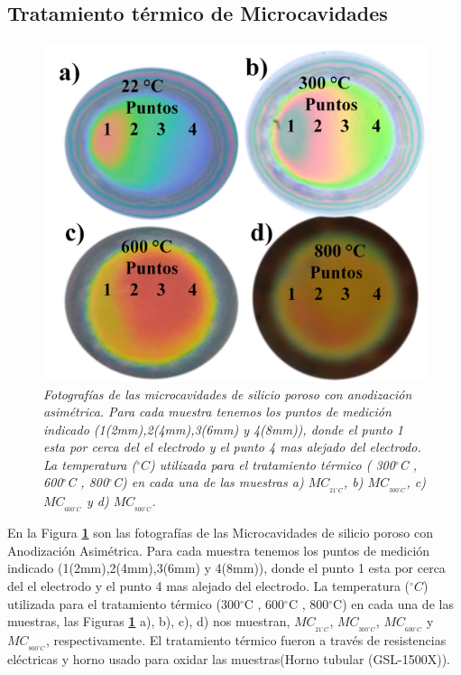 \documentclass[a4paper,11pt,]{book}
\newcommand{\grad}{$^{\circ}$}
\begin{document}
\subsection{Tratamiento térmico de Microcavidades}
\begin{figure}[H]
	\centering
	\includegraphics[scale=.15]{../Images/PsiTem}
	\caption{\emph{Fotografías de las  microcavidades de silicio poroso con anodización asimétrica. Para cada muestra tenemos los puntos de medición indicado (1(2mm),2(4mm),3(6mm) y 4(8mm)), donde el punto 1 esta por cerca del el electrodo y el punto 4 mas alejado del electrodo.  La temperatura ($^{\circ}C$) utilizada para el tratamiento térmico ( 300\grad C ,  600\grad C ,  800\grad C) en cada una de las  muestras a) $MC_{_{21^{\circ} C}}$, b) $MC_{_{300^{\circ} C}}$, c) $MC_{_{600^{\circ} C}}$ y d) $MC_{_{800^{\circ} C}}$.}}
	\label{fig:p3}
\end{figure}
En la Figura \textbf{\ref{fig:p3}} son las fotografías de las   Microcavidades de silicio poroso con Anodización Asimétrica. Para cada muestra tenemos los puntos de medición indicado (1(2mm),2(4mm),3(6mm) y 4(8mm)), donde el punto 1 esta por cerca del el electrodo y el punto 4 mas alejado del electrodo.  La temperatura ($^{\circ} C$) utilizada para el tratamiento térmico (300\grad C ,  600\grad C ,  800\grad C) en cada una de las  muestras, las Figuras \textbf{\ref{fig:p3}} a), b), c), d) nos muestran, $MC_{_{21^{\circ} C}}$,  $MC_{_{300^{\circ} C}}$,  $MC_{_{600^{\circ} C}}$ y $MC_{_{800^{\circ} C}}$, respectivamente. El tratamiento térmico   fueron  a través de resistencias eléctricas y horno usado para oxidar las muestras(Horno tubular (GSL-1500X)).
\end{document}
